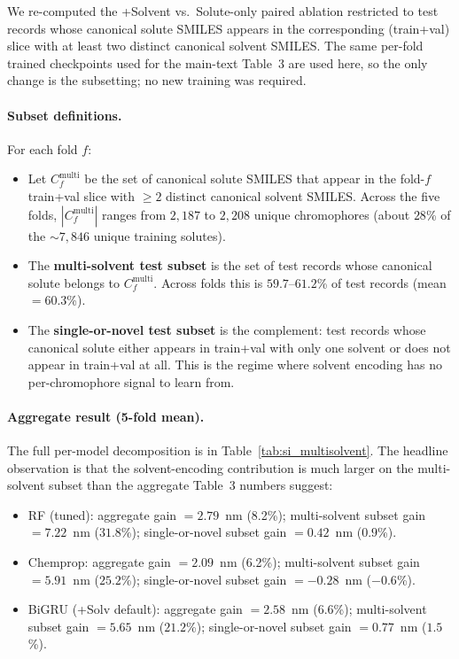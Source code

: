 \documentclass[journal=jcisd8,manuscript=suppinfo]{achemso}
\begin{document}
We re-computed the +Solvent vs.\ Solute-only paired ablation restricted to test records whose canonical solute SMILES appears in the corresponding (train+val) slice with at least two distinct canonical solvent SMILES. The same per-fold trained checkpoints used for the main-text Table~3 are used here, so the only change is the subsetting; no new training was required.

\paragraph{Subset definitions.} For each fold $f$:
\begin{itemize}[leftmargin=2em,itemsep=2pt]
 \item Let $C^{\text{multi}}_f$ be the set of canonical solute SMILES that appear in the fold-$f$ train+val slice with $\geq 2$ distinct canonical solvent SMILES. Across the five folds, $|C^{\text{multi}}_f|$ ranges from $2{,}187$ to $2{,}208$ unique chromophores (about $28$\% of the $\sim$$7{,}846$ unique training solutes).
 \item The \textbf{multi-solvent test subset} is the set of test records whose canonical solute belongs to $C^{\text{multi}}_f$. Across folds this is $59.7$--$61.2$\% of test records (mean $= 60.3$\%).
 \item The \textbf{single-or-novel test subset} is the complement: test records whose canonical solute either appears in train+val with only one solvent or does not appear in train+val at all. This is the regime where solvent encoding has no per-chromophore signal to learn from.
\end{itemize}

\paragraph{Aggregate result (5-fold mean).} The full per-model decomposition is in Table~\ref{tab:si_multisolvent}. The headline observation is that the solvent-encoding contribution is much larger on the multi-solvent subset than the aggregate Table~3 numbers suggest:
\begin{itemize}[leftmargin=2em,itemsep=2pt]
 \item RF (tuned): aggregate gain $= 2.79$~nm (8.2\%); multi-solvent subset gain $= \mathbf{7.22}$~nm ($\mathbf{31.8}$\%); single-or-novel subset gain $= 0.42$~nm ($0.9$\%).
 \item Chemprop: aggregate gain $= 2.09$~nm (6.2\%); multi-solvent subset gain $= \mathbf{5.91}$~nm ($\mathbf{25.2}$\%); single-or-novel subset gain $= -0.28$~nm ($-0.6$\%).
 \item BiGRU (+Solv default): aggregate gain $= 2.58$~nm (6.6\%); multi-solvent subset gain $= \mathbf{5.65}$~nm ($\mathbf{21.2}$\%); single-or-novel subset gain $= 0.77$~nm ($1.5$\%).
\end{itemize}
\end{document}
